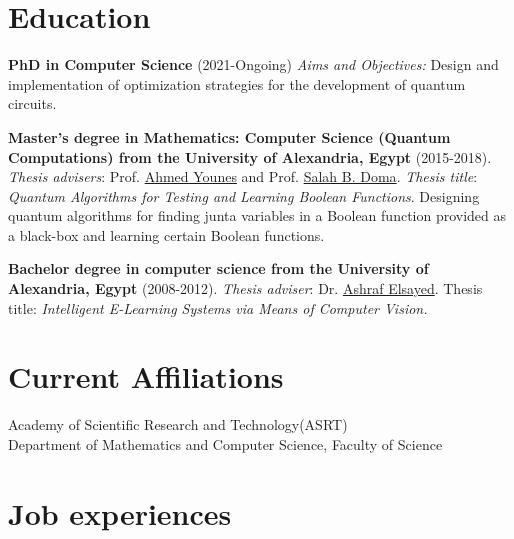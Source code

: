 \documentclass[margin,line,a4paper]{resume}
\begin{document}
\begin{resume}

        
    \section{\mysidestyle Education} 
    \textbf{PhD in Computer Science} (2021-Ongoing)
     \emph{Aims and Objectives:} Design and implementation of optimization strategies for the development of quantum circuits.    

    \textbf{Master's degree in Mathematics: Computer Science (Quantum Computations) from the University of Alexandria, Egypt} (2015-2018). 
    \emph{Thesis advisers}: Prof.  \href{https://scholar.google.com.eg/citations?user=CZz2XFIAAAAJ&hl=en}{Ahmed Younes} and Prof. \href{https://scholar.google.com.eg/citations?hl=en&user=YFeMsegAAAAJ&view_op=list_works&sortby=pubdate}{Salah B. Doma}. 
     \emph{Thesis title}: \textit{Quantum Algorithms for Testing and Learning Boolean Functions}. Designing quantum algorithms for finding junta variables in a Boolean function provided as a black-box and learning certain Boolean functions.

    \textbf{Bachelor degree in computer science from the University of Alexandria, Egypt}
    (2008-2012).  \emph{Thesis adviser}: Dr. \href{https://scholar.google.com.eg/citations?hl=en&user=G9tQkdIAAAAJ&view_op=list_works&sortby=pubdate}{Ashraf Elsayed}.
    Thesis title: \textit{Intelligent E-Learning Systems via Means of Computer Vision.}
  

\section{\mysidestyle Current Affiliations}\vspace{1mm}
\begin{description}
    \item[Academy of Scientific Research and Technology(ASRT)]
    \item[Department of Mathematics and Computer Science, Faculty of Science] 
\end{description}


\section{\mysidestyle Job experiences}\vspace{1mm}
\begin{description}
    


\end{description}
\end{resume}
\end{document}
